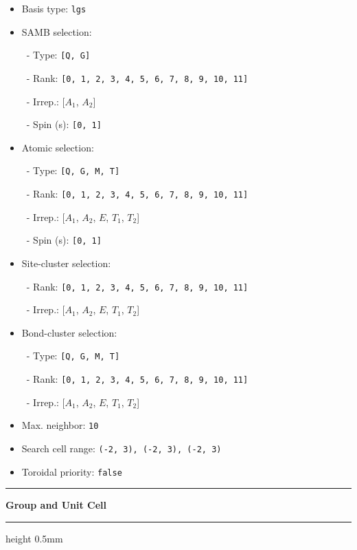 \documentclass[fleqn,10pt,landscape]{jsarticle}
\begin{document}
\begin{itemize}
\item Basis type: \texttt{lgs}

\item SAMB selection:

\, - Type: \texttt{[Q, G]}

\, - Rank: \texttt{[0, 1, 2, 3, 4, 5, 6, 7, 8, 9, 10, 11]}

\, - Irrep.: [$A_{1}$, $A_{2}$]

\, - Spin (s): \texttt{[0, 1]}

\item Atomic selection:

\, - Type: \texttt{[Q, G, M, T]}

\, - Rank: \texttt{[0, 1, 2, 3, 4, 5, 6, 7, 8, 9, 10, 11]}

\, - Irrep.: [$A_{1}$, $A_{2}$, $E$, $T_{1}$, $T_{2}$]

\, - Spin (s): \texttt{[0, 1]}

\item Site-cluster selection:

\, - Rank: \texttt{[0, 1, 2, 3, 4, 5, 6, 7, 8, 9, 10, 11]}

\, - Irrep.: [$A_{1}$, $A_{2}$, $E$, $T_{1}$, $T_{2}$]

\item Bond-cluster selection:

\, - Type: \texttt{[Q, G, M, T]}

\, - Rank: \texttt{[0, 1, 2, 3, 4, 5, 6, 7, 8, 9, 10, 11]}

\, - Irrep.: [$A_{1}$, $A_{2}$, $E$, $T_{1}$, $T_{2}$]

\item Max. neighbor: \texttt{10}

\item Search cell range: \texttt{(-2, 3), (-2, 3), (-2, 3)}

\item Toroidal priority: \texttt{false}

\end{itemize}
\vspace{5mm}
\noindent \rule[0.5mm]{5mm}{0.5mm}\hspace{3mm}\textbf{Group and Unit Cell}\hspace{3mm}\leaders\hrule height 0.5mm\hfill\kern0pt
\vspace{3mm}
\end{document}
